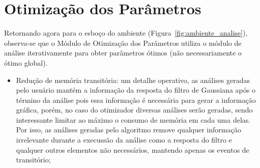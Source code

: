 \section{Otimização dos Parâmetros}
\label{sec:otimizacao}

Retornando agora para o esboço do ambiente
(Figura~\ref{fig:ambiente_analise}), observa-se que o Módulo de
Otimização dos Parâmetros utiliza o módulo de análise iterativamente
para obter parâmetros ótimos (não necessariamente o ótimo global). 

\begin{itemize}

\item Redução de memória transitória: um detalhe operativo, as
análises geradas pelo usuário mantém a informação da resposta do
filtro de Gaussiana após o término da análise pois essa informação é
necessária para gerar a informação gráfica, porém, no caso do
otimizador diversas análises serão geradas, sendo interessante limitar
ao máximo o consumo de memória em cada uma delas. Por isso, as
análises geradas pelo algoritmo remove qualquer informação irrelevante
durante a execussão da análise como a resposta do filtro e qualquer
outros elementos não necessários, mantendo apenas os eventos de
transitório;


\end{itemize}
